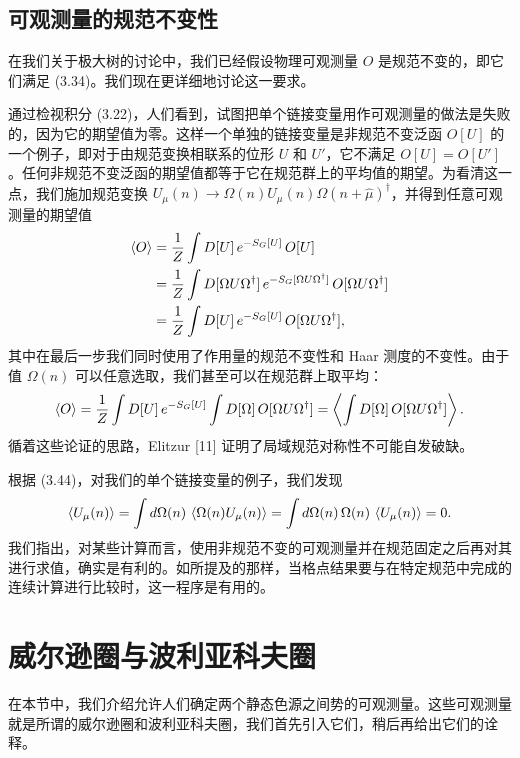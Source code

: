 \subsection{可观测量的规范不变性}

在我们关于极大树的讨论中，我们已经假设物理可观测量 $O$ 是规范不变的，即它们满足 (3.34)。我们现在更详细地讨论这一要求。

通过检视积分 (3.22)，人们看到，试图把单个链接变量用作可观测量的做法是失败的，因为它的期望值为零。这样一个单独的链接变量是非规范不变泛函 $O[U]$ 的一个例子，即对于由规范变换相联系的位形 $U$ 和 $U'$，它不满足 $O[U] = O[U']$。任何非规范不变泛函的期望值都等于它在规范群上的平均值的期望。为看清这一点，我们施加规范变换 $U_\mu(n) \to \Omega(n)U_\mu(n)\Omega(n+\hat\mu)^\dagger$，并得到任意可观测量的期望值
\begin{equation}
  \begin{split}
    \left\langle O \right\rangle &= \frac{1}{Z}\int D[U]\,e^{-S_G[U]}\,O[U]\\
    &= \frac{1}{Z}\int D[\Omega U\Omega^\dagger]\,e^{-S_G[\Omega U\Omega^\dagger]}
      \,O[\Omega U\Omega^\dagger]\\
    &= \frac{1}{Z}\int D[U]\,e^{-S_G[U]}\,O[\Omega U\Omega^\dagger] ,
  \end{split}
\end{equation}
其中在最后一步我们同时使用了作用量的规范不变性和 Haar 测度的不变性。由于值 $\Omega(n)$ 可以任意选取，我们甚至可以在规范群上取平均：
\begin{equation}
  \left\langle O \right\rangle = \frac{1}{Z}\int D[U]\,e^{-S_G[U]}
    \int D[\Omega]\,O[\Omega U\Omega^\dagger]
  = \left\langle \int D[\Omega]\,O[\Omega U\Omega^\dagger] \right\rangle .
\end{equation}
循着这些论证的思路，Elitzur [11] 证明了局域规范对称性不可能自发破缺。

根据 (3.44)，对我们的单个链接变量的例子，我们发现
\begin{equation}
  \left\langle U_\mu(n) \right\rangle
  = \int d\Omega(n)\,\left\langle \Omega(n)U_\mu(n) \right\rangle
  = \int d\Omega(n)\,\Omega(n)\,\left\langle U_\mu(n) \right\rangle = 0 .
\end{equation}
我们指出，对某些计算而言，使用非规范不变的可观测量并在规范固定之后再对其进行求值，确实是有利的。如所提及的那样，当格点结果要与在特定规范中完成的连续计算进行比较时，这一程序是有用的。

\section{威尔逊圈与波利亚科夫圈}

在本节中，我们介绍允许人们确定两个静态色源之间势的可观测量。这些可观测量就是所谓的威尔逊圈和波利亚科夫圈，我们首先引入它们，稍后再给出它们的诠释。

